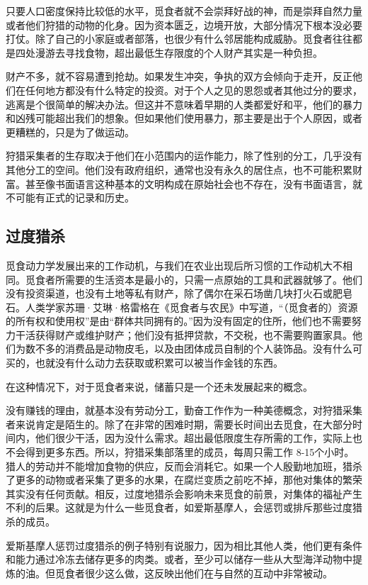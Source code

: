 只要人口密度保持比较低的水平，觅食者就不会崇拜好战的神，而是崇拜自然力量或者他们狩猎的动物的化身。因为资本匮乏，边境开放，大部分情况下根本没必要打仗。除了自己的小家庭或者部落，也很少有什么邻居能构成威胁。觅食者往往都是四处漫游去寻找食物，超出最低生存限度的个人财产其实是一种负担。

财产不多，就不容易遭到抢劫。如果发生冲突，争执的双方会倾向于走开，反正他们在任何地方都没有什么特定的投资。对于个人之见的恩怨或者其他过分的要求，逃离是个很简单的解决办法。但这并不意味着早期的人类都爱好和平，他们的暴力和凶残可能超出我们的想象。但如果他们使用暴力，那主要是出于个人原因，或者更糟糕的，只是为了做运动。

狩猎采集者的生存取决于他们在小范围内的运作能力，除了性别的分工，几乎没有其他分工的空间。他们没有政府组织，通常也没有永久的居住点，也不可能积累财富。甚至像书面语言这种基本的文明构成在原始社会也不存在，没有书面语言，就不可能有正式的记录和历史。

\subsection{过度猎杀}
觅食动力学发展出来的工作动机，与我们在农业出现后所习惯的工作动机大不相同。觅食者所需要的生活资本是最小的，只需一点原始的工具和武器就够了。他们没有投资渠道，也没有土地等私有财产，除了偶尔在采石场凿几块打火石或肥皂石。人类学家苏珊·艾琳·格雷格在《觅食者与农民》中写道，“（觅食者的）资源的所有权和使用权”是由“群体共同拥有的。”因为没有固定的住所，他们也不需要努力干活获得财产或维护财产；他们没有抵押贷款，不交税，也不需要购置家具。他们为数不多的消费品是动物皮毛，以及由团体成员自制的个人装饰品。没有什么可买的，也就没有什么动力去获取或积累可以被当作金钱的东西。

在这种情况下，对于觅食者来说，储蓄只是一个还未发展起来的概念。

没有赚钱的理由，就基本没有劳动分工，勤奋工作作为一种美德概念，对狩猎采集者来说肯定是陌生的。除了在非常的困难时期，需要长时间出去觅食，在大部分时间内，他们很少干活，因为没什么需求。超出最低限度生存所需的工作，实际上也不会得到更多东西。所以，狩猎采集部落里的成员，每周只需工作 8-15个小时。猎人的劳动并不能增加食物的供应，反而会消耗它。如果一个人殷勤地加班，猎杀了更多的动物或者采集了更多的水果，在腐烂变质之前吃不掉，那他对集体的繁荣其实没有任何贡献。相反，过度地猎杀会影响未来觅食的前景，对集体的福祉产生不利的后果。这就是为什么一些觅食者，如爱斯基摩人，会惩罚或排斥那些过度猎杀的成员。

爱斯基摩人惩罚过度猎杀的例子特别有说服力，因为相比其他人类，他们更有条件和能力通过冷冻去储存更多的肉类。或者，至少可以储存一些从大型海洋动物中提炼的油。但觅食者很少这么做，这反映出他们在与自然的互动中非常被动。

